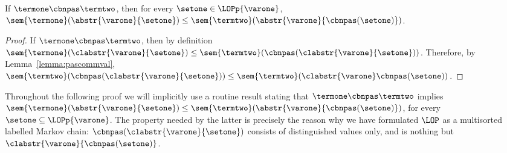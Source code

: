 \begin{lemma}\label{lemma:pascomm}
  If $\termone\cbnpas\termtwo$, then for every $\setone\in\LOPp{\varone}$,
  $\sem{\termone}(\abstr{\varone}{\setone})\leq\sem{\termtwo}(\abstr{\varone}{\cbnpas(\setone)})$.
\end{lemma}
\begin{proof}
  If $\termone\cbnpas\termtwo$, then by definition
  $\sem{\termone}(\clabstr{\varone}{\setone})\leq\sem{\termtwo}(\cbnpas(\clabstr{\varone}{\setone}))$.
  Therefore, by Lemma~\ref{lemma:pascommval},
  $\sem{\termtwo}(\cbnpas(\clabstr{\varone}{\setone}))\leq\sem{\termtwo}(\clabstr{\varone}\cbnpas(\setone))$.
\end{proof}
\begin{remark}\label{r:latetech}
  Throughout the following proof we will implicitly use a routine result
  stating that $\termone\cbnpas\termtwo$ implies
  $\sem{\termone}(\abstr{\varone}{\setone})\leq\sem{\termtwo}(\abstr{\varone}{\mathord{\cbnpas}(\setone)})$,
  for every $\setone\subseteq\LOPp{\varone}$. The property
  needed by the latter is precisely the reason why we have  formulated
  $\LOP$ as a multisorted labelled Markov chain: 
  $\mathord{\cbnpas}(\clabstr{\varone}{\setone})$ consists of distinguished
  values only, and is nothing but
  $\clabstr{\varone}{\mathord{\cbnpas}(\setone)}$.
\end{remark}

